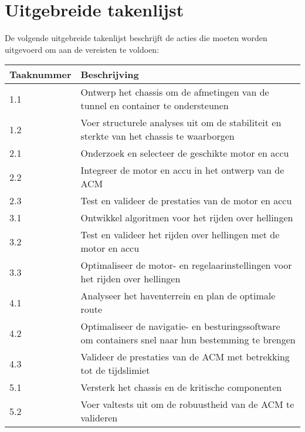 \section{Uitgebreide takenlijst}
De volgende uitgebreide takenlijst beschrijft de acties die moeten worden uitgevoerd om aan de vereisten te voldoen:

\begin{longtable}{@{}ll@{}}
    \toprule
    Taaknummer & Beschrijving                                                                                       \\
    \midrule
    \endhead

    1.1        & Ontwerp het chassis om de afmetingen van de tunnel en container te ondersteunen                    \\
    1.2        & Voer structurele analyses uit om de stabiliteit en sterkte van het chassis te waarborgen           \\

    2.1        & Onderzoek en selecteer de geschikte motor en accu                                                  \\
    2.2        & Integreer de motor en accu in het ontwerp van de ACM                                               \\
    2.3        & Test en valideer de prestaties van de motor en accu                                                \\

    3.1        & Ontwikkel algoritmen voor het rijden over hellingen                                                \\
    3.2        & Test en valideer het rijden over hellingen met de motor en accu                                    \\
    3.3        & Optimaliseer de motor- en regelaarinstellingen voor het rijden over hellingen                      \\

    4.1        & Analyseer het haventerrein en plan de optimale route                                               \\
    4.2        & Optimaliseer de navigatie- en besturingssoftware om containers snel naar hun bestemming te brengen \\
    4.3        & Valideer de prestaties van de ACM met betrekking tot de tijdslimiet                                \\

    5.1        & Versterk het chassis en de kritische componenten                                                   \\
    5.2        & Voer valtests uit om de robuustheid van de ACM te valideren                                        \\


\end{longtable}
